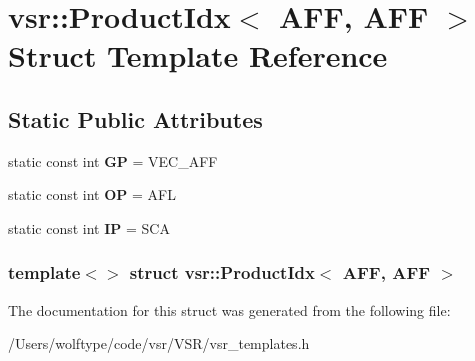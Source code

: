\hypertarget{structvsr_1_1_product_idx_3_01_a_f_f_00_01_a_f_f_01_4}{\section{vsr\-:\-:Product\-Idx$<$ A\-F\-F, A\-F\-F $>$ Struct Template Reference}
\label{structvsr_1_1_product_idx_3_01_a_f_f_00_01_a_f_f_01_4}
}
\subsection*{Static Public Attributes}
\begin{DoxyCompactItemize}
\item 
\hypertarget{structvsr_1_1_product_idx_3_01_a_f_f_00_01_a_f_f_01_4_ae12108368304268589a8476f14e68e4a}{static const int {\bfseries G\-P} = V\-E\-C\-\_\-\-A\-F\-F}\label{structvsr_1_1_product_idx_3_01_a_f_f_00_01_a_f_f_01_4_ae12108368304268589a8476f14e68e4a}

\item 
\hypertarget{structvsr_1_1_product_idx_3_01_a_f_f_00_01_a_f_f_01_4_aeb5397cbebd85e8196d46c4cd0fa14c3}{static const int {\bfseries O\-P} = A\-F\-L}\label{structvsr_1_1_product_idx_3_01_a_f_f_00_01_a_f_f_01_4_aeb5397cbebd85e8196d46c4cd0fa14c3}

\item 
\hypertarget{structvsr_1_1_product_idx_3_01_a_f_f_00_01_a_f_f_01_4_abf33c05a63860cf7180f9cac5986af02}{static const int {\bfseries I\-P} = S\-C\-A}\label{structvsr_1_1_product_idx_3_01_a_f_f_00_01_a_f_f_01_4_abf33c05a63860cf7180f9cac5986af02}

\end{DoxyCompactItemize}
\subsubsection*{template$<$$>$ struct vsr\-::\-Product\-Idx$<$ A\-F\-F, A\-F\-F $>$}



The documentation for this struct was generated from the following file\-:\begin{DoxyCompactItemize}
\item 
/\-Users/wolftype/code/vsr/\-V\-S\-R/vsr\-\_\-templates.\-h\end{DoxyCompactItemize}
